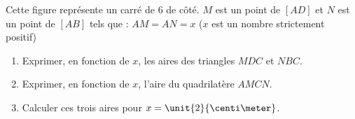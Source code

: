 
\begin{exercice}\label{exosmath-0809}

\begin{wrapfigure}[6]{r}{4.0cm}
   \vspace{-0.5cm}        %
   \centering
   
\end{wrapfigure}

    Cette figure représente un carré de \unit{6}{\centi\meter} de côté. $M$ est un point de $[AD]$ et $N$ est un point de $[AB]$ tels que : $AM = AN = x$ ($x$ est un nombre strictement positif) 

\begin{enumerate}
    \item
Exprimer, en fonction de $x$, les aires des triangles $MDC$ et $NBC$. 
\item 
    Exprimer, en fonction de $x$, l'aire du quadrilatère $AMCN$.
\item
 Calculer ces trois aires pour $x = \unit{2}{\centi\meter}$.
\end{enumerate}


\end{exercice}
